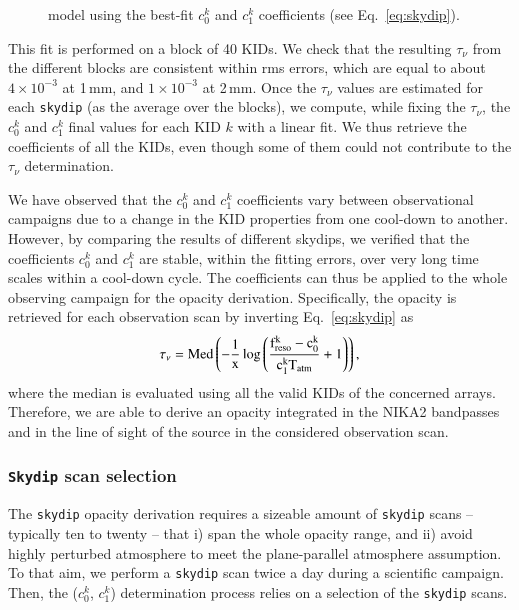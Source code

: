 \documentclass[traditionalabstract]{aa}
\newcommand{\taunu}{\tau_{\nu}}
\newcommand{\lp}[1]{#1}
\begin{document}
{\begin{figure}[!htbp]
\begin{center}
{model using the best-fit $c_0^k$ and $c_1^k$ coefficients (see
Eq.~\ref{eq:skydip}).}
\label{fig:skydipfitexample}
\end{center}
\end{figure}
%
{\lp This fit is performed on a block of 40 KIDs. We check that the
resulting $\taunu$ from the different blocks are consistent within rms
errors, which are equal to about $4\times 10^{-3}$ at 1\,mm, and
$1\times 10^{-3}$ at 2\,mm.}
Once the $\taunu$ values are estimated for each {\tt skydip} (as the average over the
blocks), we compute, while fixing the $\taunu$, the $c_0^k$ and $c_1^k$
final values for each KID $k$ with a linear fit. We thus retrieve
the coefficients of all the KIDs, even though some of them could not
contribute to the $\taunu$ determination. 

{\lp We have observed that the  $c_0^k$ and $c_1^k$ coefficients vary
between observational campaigns due to a change in the KID properties
from one cool-down to another.}
However, by comparing the results of different skydips, we verified that the
coefficients $c_0^k$ and $c_1^k$ are stable, within the fitting errors, over very
long time scales within a cool-down cycle. The coefficients can thus be
applied to the whole observing campaign for the opacity derivation. %
Specifically, the opacity %
is retrieved for each observation scan by
inverting Eq.~\ref{eq:skydip} as\begin{equation}
\taunu =   \rm{Med}\left( -\frac{1}{x} \log\left( \frac{f_{\rm{reso}}^k - c_0^k}{c_1^kT_{\rm{atm}}} +1 \right)\right), 
\end{equation}
where the median is evaluated using all the valid
KIDs of the concerned arrays. Therefore, we are able to derive an opacity
integrated in the NIKA2 bandpasses and in the line of sight of the
source in the considered observation scan.

\subsubsection{{\tt Skydip} scan selection}
\label{se:skydip-selection}

The {\tt skydip} opacity derivation requires a
sizeable amount of {\tt skydip} scans --
typically ten to twenty -- that i) span the whole opacity range, and
ii) avoid highly perturbed atmosphere to meet the plane-parallel
atmosphere assumption. To that aim, we perform a {\tt skydip}
scan twice a day during a scientific campaign. Then, the ($c_0^k$, $c_1^k$)
determination process relies on a selection of the {\tt skydip} scans.

}
\end{document}
